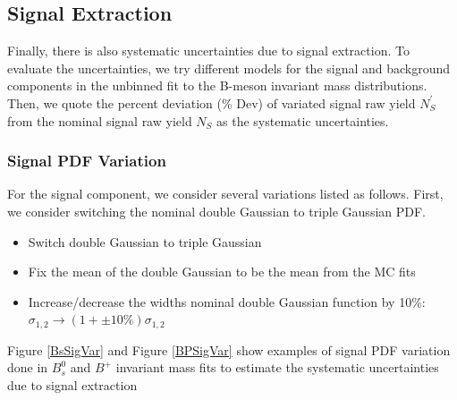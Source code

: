\subsection{Signal Extraction}

Finally, there is also systematic uncertainties due to signal extraction. To evaluate the uncertainties, we try different models for the signal and background components in the unbinned fit to the B-meson invariant mass distributions. Then, we quote the percent deviation (\% Dev) of variated signal raw yield $N_S^{'}$ from the nominal signal raw yield $N_S$ as the systematic uncertainties.  

\subsubsection{Signal PDF Variation}

For the signal component, we consider several variations listed as follows. First, we consider switching the nominal double Gaussian to triple Gaussian PDF.

\begin{itemize}
\item Switch double Gaussian to triple Gaussian
\item Fix the mean of the double Gaussian to be the mean from the MC fits
\item Increase/decrease the widths nominal double Gaussian function by 10\%: $\sigma_{1,2} \rightarrow (1 + \pm 10\%) \sigma_{1,2}$
\end{itemize}

Figure \ref{BsSigVar} and Figure \ref{BPSigVar} show examples of signal PDF variation done in $B^0_s$ and $B^+$ invariant mass fits to estimate the systematic uncertainties due to signal extraction


